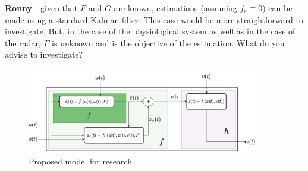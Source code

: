 \documentclass[oneside,12pt]{article}
\begin{document}
\textbf{Ronny} - given that $F$ and $G$ are known, estimations (assuming $f_r \equiv 0$) can be made using a standard Kalman filter. This case would be more straightforward to investigate. But, in the case of the physiological system as well as in the case of the radar, $F$ is unknown and is the objective of the estimation. What do you advise to investigate?  
%
%
\begin{figure}
    \centering
        \includegraphics[width=0.9\textwidth]{./Radar-general}
        \caption{\label{fig:Radar-general}Proposed model for research}
\end{figure}
%
\end{document}
